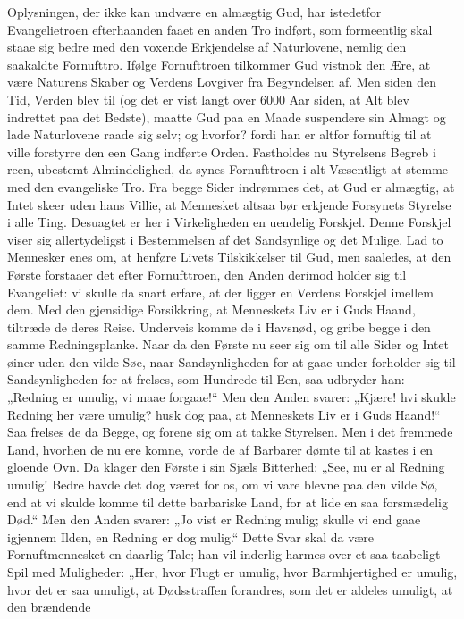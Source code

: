 \documentclass[12pt,a4paper]{book}
\begin{document}
Oplysningen, der ikke kan undvære en almægtig Gud, har istedetfor
Evangelietroen efterhaanden faaet en anden Tro indført, som formeentlig
skal staae sig bedre med den voxende Erkjendelse af Naturlovene, nemlig
den saakaldte Fornufttro. Ifølge Fornufttroen tilkommer Gud vistnok den
Ære, at være Naturens Skaber og Verdens Lovgiver fra Begyndelsen af. Men
siden den Tid, Verden blev til (og det er vist langt over 6000 Aar siden,
at Alt blev indrettet paa det Bedste), maatte Gud paa en Maade suspendere
sin Almagt og lade Naturlovene raade sig selv; og hvorfor? fordi han er
altfor fornuftig til at ville forstyrre den een Gang indførte Orden.
Fastholdes nu Styrelsens Begreb i reen, ubestemt Almindelighed, da synes
Fornufttroen i alt Væsentligt at stemme med den evangeliske Tro. Fra
begge Sider indrømmes det, at
Gud er almægtig, at Intet skeer uden hans Villie, at Mennesket altsaa bør
erkjende Forsynets Styrelse i alle Ting. Desuagtet er her i
Virkeligheden en uendelig Forskjel. Denne Forskjel viser sig
allertydeligst i Bestemmelsen af det Sandsynlige og det Mulige. Lad to
Mennesker enes om, at henføre Livets Tilskikkelser til Gud, men saaledes,
at den Første forstaaer det efter Fornufttroen, den Anden derimod holder
sig til Evangeliet: vi skulle da snart erfare, at der ligger en Verdens
Forskjel imellem dem. Med den gjensidige Forsikkring, at Menneskets Liv
er i Guds Haand, tiltræde de deres Reise. Underveis komme de i Havsnød,
og gribe begge i den samme Redningsplanke. Naar da den Første nu seer sig
om til alle Sider og Intet øiner uden den vilde Søe, naar
Sandsynligheden for at gaae under forholder sig til Sandsynligheden for
at frelses, som Hundrede til Een, saa udbryder han: „Redning er umulig,
vi maae forgaae!“ Men den Anden svarer: „Kjære! hvi skulde Redning her
være umulig? husk dog paa, at Menneskets Liv er i Guds Haand!“ Saa
frelses de da Begge, og forene sig om at takke Styrelsen. Men i det
fremmede Land, hvorhen de nu ere komne, vorde de af Barbarer dømte til at
kastes i en gloende Ovn. Da klager den Første i sin Sjæls Bitterhed:
„See, nu er al Redning umulig! Bedre havde det dog været for os, om vi
vare blevne paa den vilde Sø, end at vi skulde komme til dette barbariske
Land, for at lide en saa forsmædelig Død.“ Men den Anden svarer: „Jo vist
er Redning mulig; skulle vi end gaae igjennem Ilden, en Redning er dog
mulig.“ Dette Svar skal da være Fornuftmennesket en daarlig Tale; han vil
inderlig harmes over et saa taabeligt Spil med Muligheder: „Her, hvor
Flugt er umulig, hvor Barmhjertighed er umulig, hvor det er saa umuligt,
at Dødsstraffen forandres, som det er aldeles umuligt, at den brændende
\end{document}
